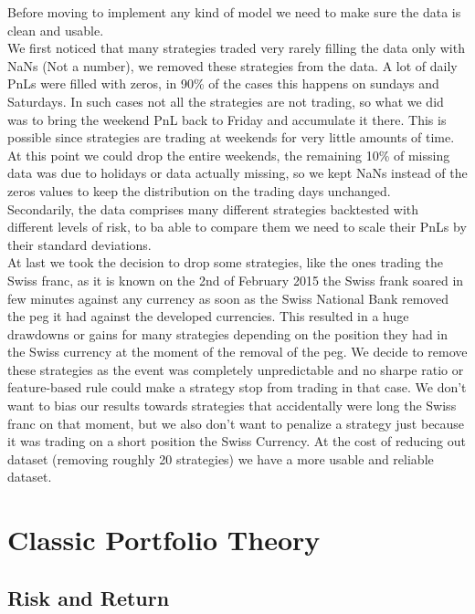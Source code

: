 \documentclass[12pt]{article} %
\numberwithin{equation}{subsection}
\begin{document}
Before moving to implement any kind of model we need to make sure the data is clean and usable.\\
We first noticed that many strategies traded very rarely filling the data only with NaNs (Not a number), we removed these strategies from the data. A lot of daily PnLs were filled with zeros, in 90\% of the cases this happens on sundays and Saturdays. In such cases not all the strategies are not trading, so what we did was to bring the weekend PnL back to Friday and accumulate it there. This is possible since strategies are trading at weekends for very little amounts of time. At this point we could drop the entire weekends, the remaining 10\% of missing data was due to holidays or data actually missing, so we kept NaNs instead of the zeros values to keep the distribution on the trading days unchanged.\\  
Secondarily, the data comprises many different strategies backtested with different levels of risk, to ba able to compare them we need to scale their PnLs by their standard deviations.\\
At last we took the decision to drop some strategies, like the ones trading the Swiss franc, as it is known on the 2nd of February 2015 the Swiss frank soared in few minutes against any currency as soon as the Swiss National Bank removed the peg it had against the developed currencies. This resulted in a huge drawdowns or gains for many strategies depending on the position they had in the Swiss currency at the moment of the removal of the peg. We decide to remove these strategies as the event was completely unpredictable and no sharpe ratio or feature-based rule could make a strategy stop from trading in that case. We don't want to bias our results towards strategies that accidentally were long the Swiss franc on that moment, but we also don't want to penalize a strategy just because it was trading on a short position the Swiss Currency. At the cost of reducing out dataset (removing roughly 20 strategies) we have a more usable and reliable dataset.

\section{Classic Portfolio Theory}

\subsection{Risk and Return}


\end{document}
